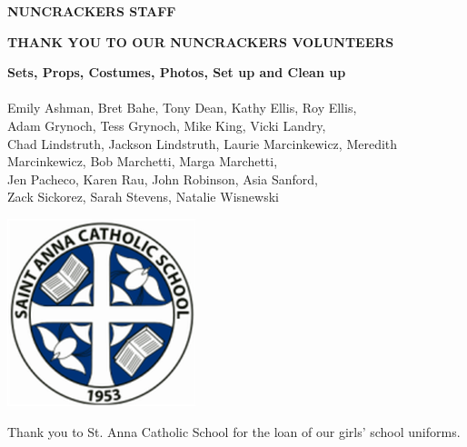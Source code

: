 \documentclass[12pt, a5paper, oneside]{article}
\begin{document}
\pagebreak
\begin{center}
\Large \textbf{NUNCRACKERS STAFF}
\end{center}
\raggedright
\begin{center}
    \Large\textbf{THANK YOU TO OUR NUNCRACKERS VOLUNTEERS}\\
\end{center}
\begin{center}
\textbf{Sets, Props, Costumes, Photos, Set up and Clean up}\\
\hfill\\
Emily Ashman, Bret Bahe, Tony Dean, Kathy Ellis, Roy Ellis,\\ Adam Grynoch, Tess Grynoch, Mike King, Vicki Landry,\\ Chad Lindstruth, Jackson Lindstruth, Laurie Marcinkewicz, Meredith Marcinkewicz, Bob Marchetti, Marga Marchetti,\\ Jen Pacheco, Karen Rau, John Robinson, Asia Sanford,\\ Zack Sickorez, Sarah Stevens, Natalie Wisnewski
\end{center}
\begin{framed}
\begin{minipage}[c][0.25\textheight]{0.5\linewidth}
	\raggedright\includegraphics[scale=0.4]{media/st_anna_logo.png}
\end{minipage}
\raggedright
\begin{minipage}[0.25\textheight]{0.4\linewidth}
\raggedright Thank you to St. Anna Catholic School for the loan of our girls' school uniforms.	
\end{minipage}
\end{framed}
\end{document}
